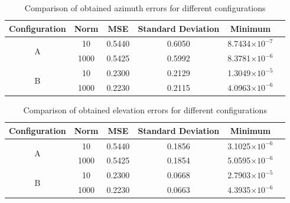 \begin{table}[!htbp] %
	\begin{center}
		\begin{tabular}{ c | c c c c c }
			\toprule
			\multicolumn{1}{c|}{Configuration} & Norm & MSE & Standard Deviation & Minimum \\
			\midrule
			\multirow{2}{*}{A} &10 & 0.5440 & 0.6050 & 8.7434$\times10^{-7}$\\
			&1000 & 0.5425 & 0.5992 &  8.3781$\times10^{-6}$\\
			\midrule			
			\multirow{2}{*}{B} &10 & 0.2300 & 0.2129 & 1.3049$\times10^{-5}$\\
			&1000 & 0.2230 & 0.2115 & 4.0963$\times10^{-6}$\\
			\bottomrule 
		\end{tabular}
		\caption{Comparison of obtained azimuth errors for different configurations}
		\label{tab:azimuth-test1}
	\end{center}
\end{table}

\begin{table}[!htbp] %
	\begin{center}
		\begin{tabular}{ c | c c c c c }
			\toprule
			\multicolumn{1}{c|}{Configuration} & Norm & MSE & Standard Deviation & Minimum \\
			\midrule
			\multirow{2}{*}{A} &10 & 0.5440  & 0.1856 & 3.1025$\times10^{-6}$  & \\
			&1000 & 0.5425 & 0.1854 & 5.0595$\times10^{-6}$ & \\
			\midrule			
			\multirow{2}{*}{B} &10 & 0.2300 & 0.0668 & 2.7903$\times10^{-5}$ \\
			&1000 & 0.2230 & 0.0663 & 4.3935$\times10^{-6}$ \\
			\bottomrule 
		\end{tabular}
		\caption{Comparison of obtained elevation errors for different configurations}
		\label{tab:elevation-test1}
	\end{center}
\end{table}


